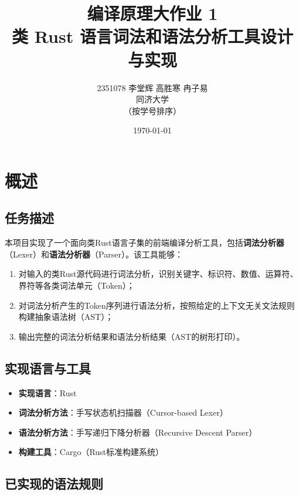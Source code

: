 \documentclass[12pt,a4paper]{ctexart}
\title{\textbf{编译原理大作业 1} \\ \Large 类 Rust 语言词法和语法分析工具设计与实现}
\author{2351078 李堂辉 \quad 2351837 高胜寒 \quad 2352197 冉子易 \\ 同济大学 \\ \small （按学号排序）}
\date{\today}
\begin{document}
\maketitle

\tableofcontents
\newpage

\section{概述}

\subsection{任务描述}

本项目实现了一个面向类Rust语言子集的前端编译分析工具，包括\textbf{词法分析器}（Lexer）和\textbf{语法分析器}（Parser）。该工具能够：

\begin{enumerate}
    \item 对输入的类Rust源代码进行词法分析，识别关键字、标识符、数值、运算符、界符等各类词法单元（Token）；
    \item 对词法分析产生的Token序列进行语法分析，按照给定的上下文无关文法规则构建抽象语法树（AST）；
    \item 输出完整的词法分析结果和语法分析结果（AST的树形打印）。
\end{enumerate}

\subsection{实现语言与工具}

\begin{itemize}
    \item \textbf{实现语言}：Rust
    \item \textbf{词法分析方法}：手写状态机扫描器（Cursor-based Lexer）
    \item \textbf{语法分析方法}：手写递归下降分析器（Recursive Descent Parser）
    \item \textbf{构建工具}：Cargo（Rust标准构建系统）
\end{itemize}

\subsection{已实现的语法规则}
\end{document}
